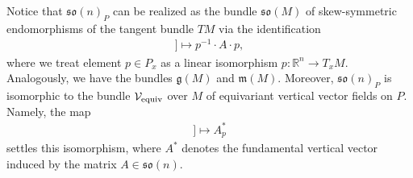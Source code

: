 \documentclass[pdftex]{sigma}
\numberwithin{equation}{section}
\begin{document}
Notice that $\mathfrak{so}(n)_P$ can be realized as the bundle $\mathfrak{so}(M)$ of skew-symmetric endomorphisms of the tangent bundle $TM$ via the identif\/ication
\begin{gather*}
[[p,A]]\mapsto p^{-1}\cdot A\cdot p,
\end{gather*}
where we treat element $p\in P_x$ as a linear isomorphism $p\colon \mathbb{R}^n\to T_xM$. Analogously, we have the bundles $\mathfrak{g}(M)$ and $\mathfrak{m}(M)$. Moreover, $\mathfrak{so}(n)_P$ is isomorphic to the bundle $\mathcal{V}_{\rm equiv}$ over $M$ of equivariant vertical vector f\/ields on $P$. Namely, the map
\begin{gather*}
[[p,A]]\mapsto A^{\ast}_p
\end{gather*}
settles this isomorphism, where $A^{\ast}$ denotes the fundamental vertical vector induced by the matrix $A\in\mathfrak{so}(n)$.
\end{document}
